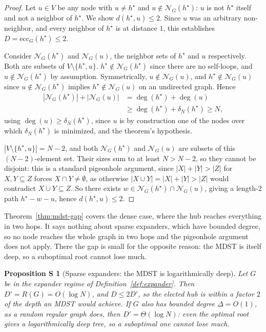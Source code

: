 \documentclass[letterpaper]{article} %
\newtheorem{sproposition}{Proposition S}
\begin{document}
\begin{proof}
Let $u \in V$ be any node with $u \neq h^\star$ and $u \notin
\mathcal{N}_G(h^\star)$: $u$ is not $h^\star$ itself and not a neighbor of
$h^\star$. We show $d(h^\star, u) \leq 2$. Since $u$ was an arbitrary
non-neighbor, and every neighbor of $h^\star$ is at distance $1$, this
establishes $D = \mathrm{ecc}_G(h^\star) \leq 2$.

Consider $\mathcal{N}_G(h^\star)$ and $\mathcal{N}_G(u)$, the neighbor sets
of $h^\star$ and $u$ respectively. Both are subsets of $V \setminus
\{h^\star, u\}$. $h^\star \notin \mathcal{N}_G(h^\star)$ since there are no
self-loops, and $u \notin \mathcal{N}_G(h^\star)$ by assumption.
Symmetrically, $u \notin \mathcal{N}_G(u)$, and $h^\star \notin
\mathcal{N}_G(u)$ since $u \notin \mathcal{N}_G(h^\star)$ implies $h^\star
\notin \mathcal{N}_G(u)$ on an undirected graph. Hence
\begin{align*}
|\mathcal{N}_G(h^\star)| + |\mathcal{N}_G(u)| &= \deg(h^\star) + \deg(u) \\
&\geq \deg(h^\star) + \delta_{\bar N}(h^\star) \geq N,
\end{align*}
using $\deg(u) \geq \delta_{\bar N}(h^\star)$, since $u$ is by construction
one of the nodes over which $\delta_{\bar N}(h^\star)$ is minimized, and
the theorem's hypothesis.

$|V \setminus \{h^\star, u\}| = N - 2$, and both $\mathcal{N}_G(h^\star)$
and $\mathcal{N}_G(u)$ are subsets of this $(N-2)$-element set. Their sizes
sum to at least $N > N-2$, so they cannot be disjoint: this is a standard
pigeonhole argument, since $|X|+|Y| > |Z|$ for $X,Y\subseteq Z$ forces
$X\cap Y\neq\emptyset$, as otherwise $|X\cup Y| = |X|+|Y| > |Z|$ would
contradict $X\cup Y\subseteq Z$. So there exists $w \in
\mathcal{N}_G(h^\star)\cap\mathcal{N}_G(u)$, giving a length-2 path
$h^\star - w - u$, hence $d(h^\star,u)\leq 2$.
\end{proof}

Theorem~\ref{thm:mdst-gap} covers the dense case, where the hub reaches
everything in two hops. It says nothing about sparse expanders, which have
bounded degree, so no node reaches the whole graph in two hops and the
pigeonhole argument does not apply. There the gap is small for the opposite
reason: the MDST is itself deep, so a suboptimal root cannot lose much.

\begin{sproposition}[Sparse expanders: the MDST is logarithmically deep]
\label{prop:mdst-sparse}
Let $G$ be in the expander regime of Definition~\ref{def:expander}. Then $D'
= R(G) = O(\log N)$, and $D \leq 2D'$, so the elected hub is within a factor
$2$ of the depth an MDST would achieve. If $G$ also has bounded degree
$\Delta = O(1)$, as a random regular graph does, then $D' = \Theta(\log N)$:
even the optimal root gives a logarithmically deep tree, so a suboptimal one
cannot lose much.
\end{sproposition}
\end{document}
